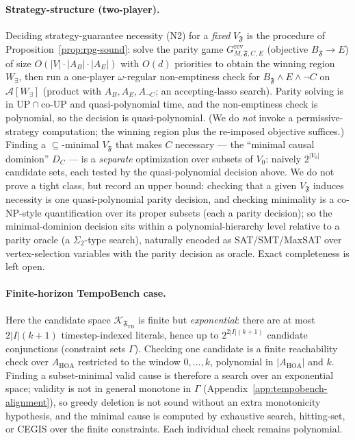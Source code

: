 \documentclass[11pt]{article}
\theoremstyle{remark}
\newcommand{\Frame}{\mathfrak{F}}
\begin{document}
\paragraph{Strategy-structure (two-player).} Deciding strategy-guarantee
necessity (N2) for a \emph{fixed} \(V_{\Frame}\) is the procedure of
Proposition~\ref{prop:rpg-sound}: solve the parity game
\(G^{\mathrm{rev}}_{M,\Frame,C,E}\) (objective \(B_{\Frame}\rightarrow E\)) of size
\(O(|V|\cdot|A_B|\cdot|A_E|)\) with \(O(d)\) priorities to obtain the winning
region \(W_\exists\), then run a one-player \(\omega\)-regular non-emptiness check
for \(B_{\Frame}\wedge E\wedge\neg C\) on \(\mathcal{A}[W_\exists]\) (product with
\(A_B,A_E,A_{\neg C}\); an accepting-lasso search). Parity solving is in
\(\mathrm{UP}\cap\mathrm{co\text{-}UP}\) and quasi-polynomial time, and the
non-emptiness check is polynomial, so the decision is quasi-polynomial. (We do
\emph{not} invoke a permissive-strategy computation; the winning region plus the
re-imposed objective suffices.) Finding a \(\subseteq\)-minimal \(V_{\Frame}\) that
makes \(C\) necessary --- the ``minimal causal dominion'' \(D_C\) --- is a
\emph{separate} optimization over subsets of \(V_0\): naively \(2^{|V_0|}\)
candidate sets, each tested by the quasi-polynomial decision above. We do not
prove a tight class, but record an upper bound: checking that a given
\(V_{\Frame}\) induces necessity is one quasi-polynomial parity decision, and
checking minimality is a co-\(\mathrm{NP}\)-style quantification over its proper
subsets (each a parity decision); so the minimal-dominion decision sits within a
polynomial-hierarchy level relative to a parity oracle (a \(\Sigma_2\)-type
search), naturally encoded as SAT/SMT/MaxSAT over vertex-selection variables with
the parity decision as oracle. Exact completeness is left open.

\paragraph{Finite-horizon TempoBench case.} Here the candidate space
\(\mathcal{K}_{\Frame_{\mathrm{TB}}}\) is finite but \emph{exponential}: there are
at most \(2|I|(k+1)\) timestep-indexed literals, hence up to
\(2^{2|I|(k+1)}\) candidate conjunctions (constraint sets \(\Gamma\)). Checking
one candidate is a finite reachability check over \(A_{\mathrm{HOA}}\) restricted
to the window \(0,\ldots,k\), polynomial in \(|A_{\mathrm{HOA}}|\) and \(k\).
Finding a subset-minimal valid cause is therefore a search over an exponential
space; validity is not in general monotone in \(\Gamma\)
(Appendix~\ref{app:tempobench-alignment}), so greedy deletion is not sound without
an extra monotonicity hypothesis, and the minimal cause is computed by exhaustive
search, hitting-set, or CEGIS over the finite constraints. Each individual check
remains polynomial.
\end{document}

